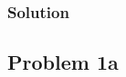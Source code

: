 \documentclass[conf]{new-aiaa}
\begin{document}
\subsubsection*{Solution} 

%
%



\subsection*{Problem 1a} 

\begin{center}
	 \\
\end{center}
\end{document}

